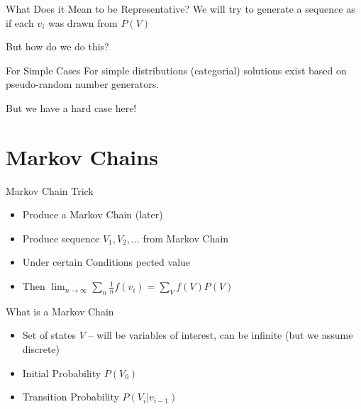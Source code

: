 \documentclass[11pt]{beamer}
\begin{document}
	\begin{frame}{What Does it Mean to be Representative?}
		We will try to generate a sequence as if each $v_i$ was drawn from $P(V)$
		
		\vspace{10pt} But how do we do this?
	\end{frame}
	
	\begin{frame}{For Simple Cases}
		For simple distributions (categorial) solutions exist based on pseudo-random number generators.
		
		\vspace{10pt} But we have a hard case here!
	\end{frame}
	
	\section{Markov Chains}
	
	\begin{frame}{Markov Chain Trick}
		\begin{itemize}
			\item  Produce a Markov Chain (later)
			\item  Produce sequence $V_1,V_2,\dots$ from Markov Chain
			\item Under certain Conditions pected value
			\item Then $\lim_{n \rightarrow \infty} \sum_{n} \frac{1}{n} f(v_i) = \sum_{V} f(V) P(V)$
		\end{itemize}
	\end{frame}
	
	\begin{frame}{What is a Markov Chain}
		\begin{itemize}
			\item Set of states $V$ -- will be variables of interest, can be infinite (but we assume discrete)
			\item Initial Probability $P(V_0)$
			\item Transition Probability $P(V_i|v_{i-1})$
		\end{itemize}
	\end{frame}
	
\end{document}
